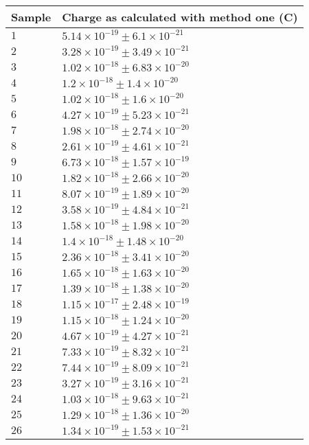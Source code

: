 \begin{tabular}{| p{} | p{} |}
\hline
Sample & Charge as calculated with method one (C)\\
\hline
$1$ & $5.14\times 10^{-19} \pm 6.1\times10^{-21}$\\
$2$ & $3.28\times 10^{-19} \pm 3.49\times10^{-21}$\\
$3$ & $1.02\times 10^{-18} \pm 6.83\times10^{-20}$\\
$4$ & $1.2\times 10^{-18} \pm 1.4\times10^{-20}$\\
$5$ & $1.02\times 10^{-18} \pm 1.6\times10^{-20}$\\
$6$ & $4.27\times 10^{-19} \pm 5.23\times10^{-21}$\\
$7$ & $1.98\times 10^{-18} \pm 2.74\times10^{-20}$\\
$8$ & $2.61\times 10^{-19} \pm 4.61\times10^{-21}$\\
$9$ & $6.73\times 10^{-18} \pm 1.57\times10^{-19}$\\
$10$ & $1.82\times 10^{-18} \pm 2.66\times10^{-20}$\\
$11$ & $8.07\times 10^{-19} \pm 1.89\times10^{-20}$\\
$12$ & $3.58\times 10^{-19} \pm 4.84\times10^{-21}$\\
$13$ & $1.58\times 10^{-18} \pm 1.98\times10^{-20}$\\
$14$ & $1.4\times 10^{-18} \pm 1.48\times10^{-20}$\\
$15$ & $2.36\times 10^{-18} \pm 3.41\times10^{-20}$\\
$16$ & $1.65\times 10^{-18} \pm 1.63\times10^{-20}$\\
$17$ & $1.39\times 10^{-18} \pm 1.38\times10^{-20}$\\
$18$ & $1.15\times 10^{-17} \pm 2.48\times10^{-19}$\\
$19$ & $1.15\times 10^{-18} \pm 1.24\times10^{-20}$\\
$20$ & $4.67\times 10^{-19} \pm 4.27\times10^{-21}$\\
$21$ & $7.33\times 10^{-19} \pm 8.32\times10^{-21}$\\
$22$ & $7.44\times 10^{-19} \pm 8.09\times10^{-21}$\\
$23$ & $3.27\times 10^{-19} \pm 3.16\times10^{-21}$\\
$24$ & $1.03\times 10^{-18} \pm 9.63\times10^{-21}$\\
$25$ & $1.29\times 10^{-18} \pm 1.36\times10^{-20}$\\
$26$ & $1.34\times 10^{-19} \pm 1.53\times10^{-21}$\\

\end{tabular}
